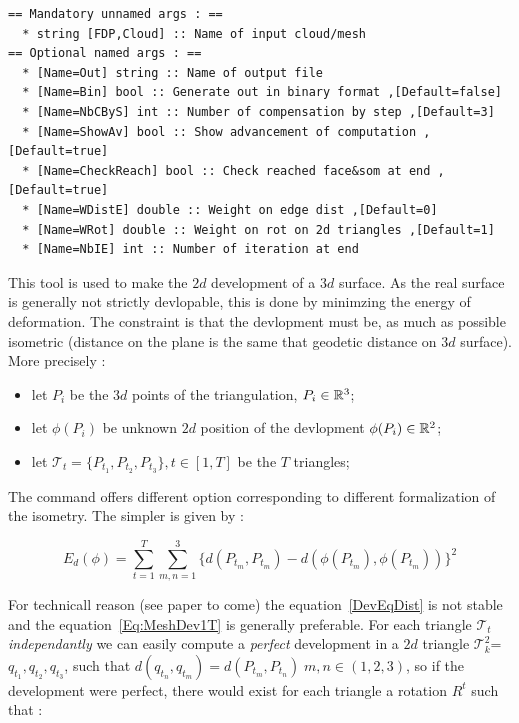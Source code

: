 \begin{verbatim}
== Mandatory unnamed args : ==
  * string [FDP,Cloud] :: Name of input cloud/mesh
== Optional named args : ==
  * [Name=Out] string :: Name of output file
  * [Name=Bin] bool :: Generate out in binary format ,[Default=false]
  * [Name=NbCByS] int :: Number of compensation by step ,[Default=3]
  * [Name=ShowAv] bool :: Show advancement of computation ,[Default=true]
  * [Name=CheckReach] bool :: Check reached face&som at end ,[Default=true]
  * [Name=WDistE] double :: Weight on edge dist ,[Default=0]
  * [Name=WRot] double :: Weight on rot on 2d triangles ,[Default=1]
  * [Name=NbIE] int :: Number of iteration at end
\end{verbatim}

This tool is used to make the $2d$ development of a $3d$ surface. As the real surface
is generally not strictly devlopable, this is done by minimzing the energy of deformation.
The constraint is that the devlopment must be, as much as possible isometric (distance on
the plane is the same that geodetic distance on $3d$ surface).  More precisely :

\begin{itemize}
      \item let  $P_i$ be the $3d$ points of the triangulation, $P_i \in \mathbb{R}^3$;
      \item let  $\phi(P_i)$ be unknown $2d$  position of the devlopment $\phi(P_i) \in \mathbb{R}^2$;
      \item let  $\mathcal{T}_t = \{P_{t_1},P_{t_2},P_{t_3}\}, t \in [1,T] $ be the $T$ triangles;
\end{itemize}


The command offers different option corresponding to different formalization of the isometry.
The simpler is given by :

\begin{equation}
   E_d(\phi) =   \sum_{t=1}^T \sum_{m,n=1}^3  \{ d(P_{t_m},P_{t_m})-  d(\phi(P_{t_m}),\phi(P_{t_m})) \}  ^2
   \label{DevEqDist}
\end{equation}

For technicall reason (see paper to come) the equation~\ref{DevEqDist} is not stable and
the equation~\ref{Eq:MeshDev1T} is generally preferable.
For each triangle  $\mathcal{T}_t$ \emph{independantly} we can easily compute a \emph{perfect} development
in a $2d$ triangle $\mathcal{T}^2_k$= $q_{t_1},q_{t_2},q_{t_3}$, such that 
$d(q_{t_n},q_{t_m})=d(P_{t_m},P_{t_n}) \; m,n \in (1,2,3)$, so if the development
were perfect, there would exist for each triangle a rotation $R^t$ such that :

